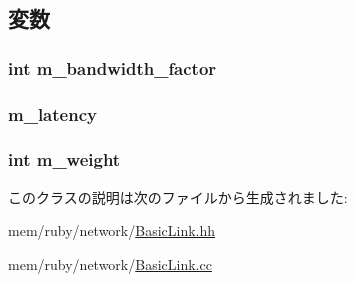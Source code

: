 \subsection{変数}
\hypertarget{classBasicLink_acf83363c1d57f479c74420a1fdcf035d}{
\subsubsection[{m\_\-bandwidth\_\-factor}]{\setlength{\rightskip}{0pt plus 5cm}int {\bf m\_\-bandwidth\_\-factor}}}
\label{classBasicLink_acf83363c1d57f479c74420a1fdcf035d}
\hypertarget{classBasicLink_a7599697a6c831356525c7d97604edd31}{
\subsubsection[{m\_\-latency}]{ {\bf m\_\-latency}}}
\label{classBasicLink_a7599697a6c831356525c7d97604edd31}
\hypertarget{classBasicLink_a7433e72c366862b58f3fcf177831dd2e}{
\subsubsection[{m\_\-weight}]{\setlength{\rightskip}{0pt plus 5cm}int {\bf m\_\-weight}}}
\label{classBasicLink_a7433e72c366862b58f3fcf177831dd2e}


このクラスの説明は次のファイルから生成されました:\begin{DoxyCompactItemize}
\item 
mem/ruby/network/\hyperlink{BasicLink_8hh}{BasicLink.hh}\item 
mem/ruby/network/\hyperlink{BasicLink_8cc}{BasicLink.cc}\end{DoxyCompactItemize}
